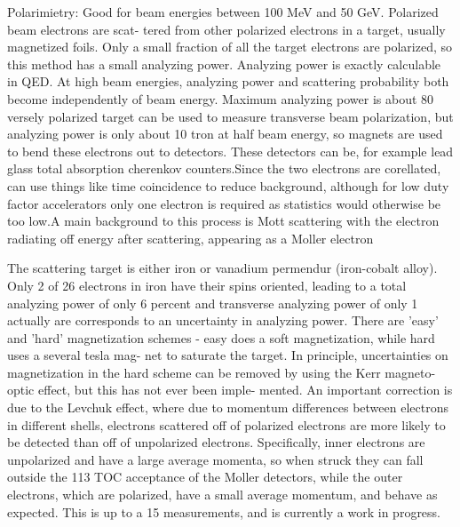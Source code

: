             Polarimietry: 
                    Good for beam energies between 100 MeV and 50 GeV. Polarized beam electrons are scat-
            tered from other polarized electrons in a target, usually magnetized foils. Only a small
            fraction of all the target electrons are polarized, so this method has a small analyzing
            power. Analyzing power is exactly calculable in QED. At high beam energies, analyzing
            power and scattering probability both become independently of beam energy. Maximum
            analyzing power is about 80%
            versely polarized target can be used to measure transverse beam polarization, but analyzing
            power is only about 10%
            tron at half beam energy, so magnets are used to bend these electrons out to detectors.
            These detectors can be, for example lead glass total absorption cherenkov counters.Since
            the two electrons are corellated, can use things like time coincidence to reduce background,
            although for low duty factor accelerators only one electron is required as statistics would
            otherwise be too low.A main background to this process is Mott scattering with the electron
            radiating off energy after scattering, appearing as a Moller electron
            
            The scattering target is either iron or vanadium permendur (iron-cobalt alloy). Only 2 of
            26 electrons in iron have their spins oriented, leading to a total analyzing power of only 6 percent
            and transverse analyzing power of only 1%
            actually are corresponds to an uncertainty in analyzing power. There are ’easy’ and ’hard’
            magnetization schemes - easy does a soft magnetization, while hard uses a several tesla mag-
            net to saturate the target. In principle, uncertainties on magnetization in the hard scheme
            can be removed by using the Kerr magneto-optic effect, but this has not ever been imple-
            mented. An important correction is due to the Levchuk effect, where due to momentum
            differences between electrons in different shells, electrons scattered off of polarized electrons
            are more likely to be detected than off of unpolarized electrons. Specifically, inner electrons
            are unpolarized and have a large average momenta, so when struck they can fall outside the
            113 TOC
            acceptance of the Moller detectors, while the outer electrons, which are polarized, have a
            small average momentum, and behave as expected. This is up to a 15%
            measurements, and is currently a work in progress.
            

